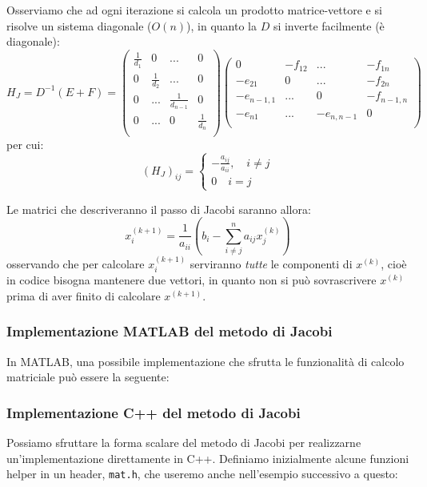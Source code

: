 \documentclass[a4paper,11pt]{article}
\begin{document}
Osserviamo che ad ogni iterazione si calcola un prodotto matrice-vettore e si risolve un sistema diagonale ($O(n)$), in quanto la $D$ si inverte facilmente (è diagonale):
$$
H_J = D^{-1} (E + F) = 
\begin{pmatrix}
	\frac{1}{d_1} & 0 & ... & 0 \\
	0 & \frac{1}{d_2} & ... & 0 \\
	0 & ... & \frac{1}{d_{n-1}} & 0 \\
	0 & ... & 0 & \frac{1}{d_n} \\
\end{pmatrix}
\begin{pmatrix}
	0 & -f_{12} & ... & -f_{1n} \\
	-e_{21} & 0 & ... & -f_{2n} \\
	-e_{n-1,1} & ... & 0 & -f_{n-1, n} \\
	-e_{n1} & ... & -e_{n, n-1} & 0 \\
\end{pmatrix}
$$
per cui:
$$
(H_J)_{ij} = 
\begin{cases}
	-\frac{ a_{ij} }{a_{ii}}, \quad i \neq j \\ 
	0 \quad i = j
\end{cases}
$$

Le matrici che descriveranno il passo di Jacobi saranno allora:
$$
x_i^{(k + 1)} = \frac{1}{a_{ii}} \left( b_i - \sum_{i \neq j}^n a_{ij} x_j^{(k)}  \right)
$$
osservando che per calcolare $x_i^{(k + 1)}$ serviranno \textit{tutte} le componenti di $x^{(k)}$, cioè in codice bisogna mantenere due vettori, in quanto non si può sovrascrivere $x^{(k)}$ prima di aver finito di calcolare $x^{(k + 1)}$.

\subsubsection{Implementazione MATLAB del metodo di Jacobi}
In MATLAB, una possibile implementazione che sfrutta le funzionalità di calcolo matriciale può essere la seguente:

\lstset{style=codestyle, language=MATLAB}


\subsubsection{Implementazione C++ del metodo di Jacobi}
Possiamo sfruttare la forma scalare del metodo di Jacobi per realizzarne un'implementazione direttamente in C++.
Definiamo inizialmente alcune funzioni helper in un header, \lstinline|mat.h|, che useremo anche nell'esempio successivo a questo:
\lstset{style=codestyle, language=c++}

\end{document}
